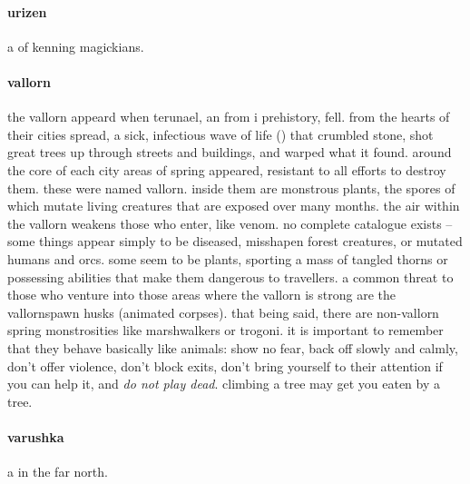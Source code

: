 \paragraph{urizen} a  of kenning magickians.
\paragraph{vallorn} the vallorn appeard when terunael, an  from i prehistory, fell. from the hearts of their cities spread, a sick, infectious wave of life () that crumbled stone, shot great trees up through streets and buildings, and warped what it found. around the core of each city areas of spring appeared, resistant to all efforts to destroy them. these were named vallorn. inside them are monstrous plants, the spores of which mutate living creatures that are exposed over many months. the air within the vallorn weakens those who enter, like venom. no complete catalogue exists – some things appear simply to be diseased, misshapen forest creatures, or mutated humans and orcs. some seem to be plants, sporting a mass of tangled thorns or possessing abilities that make them dangerous to travellers. a common threat to those who venture into those areas where the vallorn is strong are the vallornspawn husks (animated corpses). that being said, there are non-vallorn spring monstrosities like marshwalkers or trogoni. it is important to remember that they behave basically like animals: show no fear, back off slowly and calmly, don't offer violence, don't block exits, don't bring yourself to their attention if you can help it, and \emph{do not play dead}. climbing a tree may get you eaten by a tree.
\paragraph{varushka} a  in the far north.
